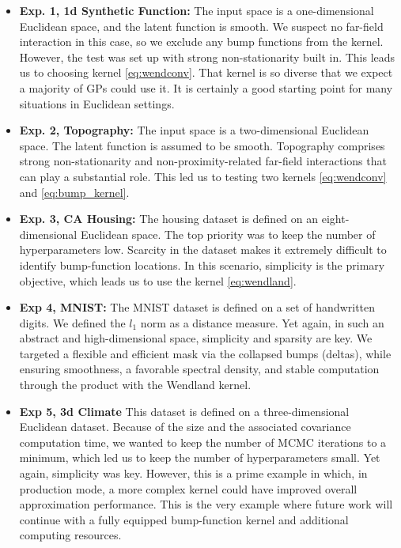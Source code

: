 \documentclass{article}
\begin{document}
\begin{itemize}
    \item \textbf{Exp. 1, 1d Synthetic Function:} The input space is a one-dimensional Euclidean space, and the latent function is smooth. We suspect no far-field interaction in this case, so we exclude any bump functions from the kernel. However, the test was set up with strong non-stationarity built in. This leads us to choosing kernel \eqref{eq:wendconv}. That kernel is so diverse that we expect a majority of GPs could use it. It is certainly a good starting point for many situations in Euclidean settings.
    \item \textbf{Exp. 2, Topography:} The input space is a two-dimensional Euclidean space. The latent function is assumed to be smooth. Topography comprises strong non-stationarity and non-proximity-related far-field interactions that can play a substantial role. This led us to testing two kernels \eqref{eq:wendconv} and \eqref{eq:bump_kernel}.
    \item \textbf{Exp. 3, CA Housing:} The housing dataset is defined on an eight-dimensional Euclidean space. The top priority was to keep the number of hyperparameters low. Scarcity in the dataset makes it extremely difficult to identify bump-function locations. In this scenario, simplicity is the primary objective, which leads us to use the kernel \eqref{eq:wendland}.
    \item \textbf{Exp 4, MNIST:} The MNIST dataset is defined on a set of handwritten digits. We defined the $l_1$ norm as a distance measure. Yet again, in such an abstract and high-dimensional space, simplicity and sparsity are key. We targeted a flexible and efficient mask via the collapsed bumps (deltas), while ensuring smoothness, a favorable spectral density, and stable computation through the product with the Wendland kernel. 
    \item \textbf{Exp 5, 3d Climate} This dataset is defined on a three-dimensional Euclidean dataset. Because of the size and the associated covariance computation time, we wanted to keep the number of MCMC iterations to a minimum, which led us to keep the number of hyperparameters small. Yet again, simplicity was key. However, this is a prime example in which, in production mode, a more complex kernel could have improved overall approximation performance. This is the very example where future work will continue with a fully equipped bump-function kernel and additional computing resources. 
\end{itemize}
\end{document}
